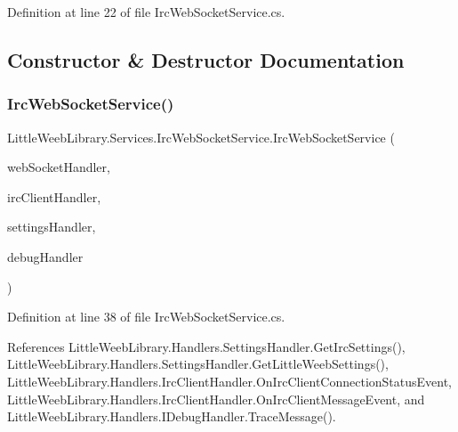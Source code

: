Definition at line 22 of file Irc\+Web\+Socket\+Service.\+cs.



\subsection{Constructor \& Destructor Documentation}
\mbox{\label{class_little_weeb_library_1_1_services_1_1_irc_web_socket_service_a3265383962fc71a18b9a6fa0c4c84797}} 
\subsubsection{\texorpdfstring{Irc\+Web\+Socket\+Service()}{IrcWebSocketService()}}
{\footnotesize\ttfamily Little\+Weeb\+Library.\+Services.\+Irc\+Web\+Socket\+Service.\+Irc\+Web\+Socket\+Service (\begin{DoxyParamCaption}\item[{\mbox{\hyperlink{interface_little_weeb_library_1_1_handlers_1_1_i_web_socket_handler}{I\+Web\+Socket\+Handler}}}]{web\+Socket\+Handler,  }\item[{\mbox{\hyperlink{interface_little_weeb_library_1_1_handlers_1_1_i_irc_client_handler}{I\+Irc\+Client\+Handler}}}]{irc\+Client\+Handler,  }\item[{\mbox{\hyperlink{interface_little_weeb_library_1_1_handlers_1_1_i_settings_handler}{I\+Settings\+Handler}}}]{settings\+Handler,  }\item[{\mbox{\hyperlink{interface_little_weeb_library_1_1_handlers_1_1_i_debug_handler}{I\+Debug\+Handler}}}]{debug\+Handler }\end{DoxyParamCaption})}



Definition at line 38 of file Irc\+Web\+Socket\+Service.\+cs.



References Little\+Weeb\+Library.\+Handlers.\+Settings\+Handler.\+Get\+Irc\+Settings(), Little\+Weeb\+Library.\+Handlers.\+Settings\+Handler.\+Get\+Little\+Weeb\+Settings(), Little\+Weeb\+Library.\+Handlers.\+Irc\+Client\+Handler.\+On\+Irc\+Client\+Connection\+Status\+Event, Little\+Weeb\+Library.\+Handlers.\+Irc\+Client\+Handler.\+On\+Irc\+Client\+Message\+Event, and Little\+Weeb\+Library.\+Handlers.\+I\+Debug\+Handler.\+Trace\+Message().


